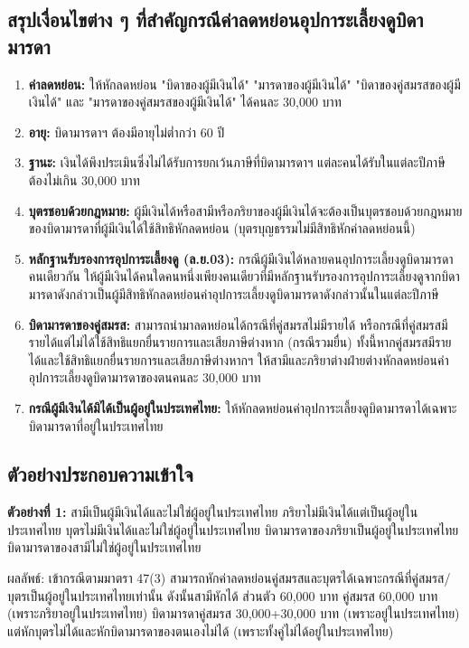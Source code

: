 \documentclass[12pt,a4paper]{article}
\begin{document}
\subsection*{สรุปเงื่อนไขต่าง ๆ ที่สำคัญกรณีค่าลดหย่อนอุปการะเลี้ยงดูบิดามารดา}

\begin{enumerate}
    \item \textbf{ค่าลดหย่อน:} ให้หักลดหย่อน "บิดาของผู้มีเงินได้" "มารดาของผู้มีเงินได้" "บิดาของคู่สมรสของผู้มีเงินได้" และ "มารดาของคู่สมรสของผู้มีเงินได้" ได้คนละ 30,000 บาท
    \item \textbf{อายุ:} บิดามารดาฯ ต้องมีอายุไม่ต่ำกว่า 60 ปี
    \item \textbf{ฐานะ:} เงินได้พึงประเมินซึ่งไม่ได้รับการยกเว้นภาษีที่บิดามารดาฯ แต่ละคนได้รับในแต่ละปีภาษี ต้องไม่เกิน 30,000 บาท
    \item \textbf{บุตรชอบด้วยกฎหมาย:} ผู้มีเงินได้หรือสามีหรือภริยาของผู้มีเงินได้จะต้องเป็นบุตรชอบด้วยกฎหมายของบิดามารดาที่ผู้มีเงินได้ใช้สิทธิหักลดหย่อน (บุตรบุญธรรมไม่มีสิทธิหักค่าลดหย่อนนี้)
    \item \textbf{หลักฐานรับรองการอุปการะเลี้ยงดู (ล.ย.03):} กรณีผู้มีเงินได้หลายคนอุปการะเลี้ยงดูบิดามารดาคนเดียวกัน ให้ผู้มีเงินได้คนใดคนหนึ่งเพียงคนเดียวที่มีหลักฐานรับรองการอุปการะเลี้ยงดูจากบิดามารดาดังกล่าวเป็นผู้มีสิทธิหักลดหย่อนค่าอุปการะเลี้ยงดูบิดามารดาดังกล่าวนั้นในแต่ละปีภาษี
    \item \textbf{บิดามารดาของคู่สมรส:} สามารถนำมาลดหย่อนได้กรณีที่คู่สมรสไม่มีรายได้ หรือกรณีที่คู่สมรสมีรายได้แต่ไม่ได้ใช้สิทธิแยกยื่นรายการและเสียภาษีต่างหาก (กรณีรวมยื่น) ทั้งนี้หากคู่สมรสมีรายได้และใช้สิทธิแยกยื่นรายการและเสียภาษีต่างหากฯ ให้สามีและภริยาต่างฝ่ายต่างหักลดหย่อนค่าอุปการะเลี้ยงดูบิดามารดาของตนคนละ 30,000 บาท
    \item \textbf{กรณีผู้มีเงินได้มิได้เป็นผู้อยู่ในประเทศไทย:} ให้หักลดหย่อนค่าอุปการะเลี้ยงดูบิดามารดาได้เฉพาะบิดามารดาที่อยู่ในประเทศไทย
\end{enumerate}

\subsection*{ตัวอย่างประกอบความเข้าใจ}

\textbf{ตัวอย่างที่ 1:} สามีเป็นผู้มีเงินได้และไม่ใช่ผู้อยู่ในประเทศไทย ภริยาไม่มีเงินได้แต่เป็นผู้อยู่ในประเทศไทย บุตรไม่มีเงินได้และไม่ใช่ผู้อยู่ในประเทศไทย บิดามารดาของภริยาเป็นผู้อยู่ในประเทศไทย บิดามารดาของสามีไม่ใช่ผู้อยู่ในประเทศไทย

ผลลัพธ์: เข้ากรณีตามมาตรา 47(3) สามารถหักค่าลดหย่อนคู่สมรสและบุตรได้เฉพาะกรณีที่คู่สมรส/บุตรเป็นผู้อยู่ในประเทศไทยเท่านั้น ดังนั้นสามีหักได้ ส่วนตัว 60,000 บาท คู่สมรส 60,000 บาท (เพราะภริยาอยู่ในประเทศไทย) บิดามารดาคู่สมรส 30,000+30,000 บาท (เพราะอยู่ในประเทศไทย) แต่หักบุตรไม่ได้และหักบิดามารดาของตนเองไม่ได้ (เพราะทั้งคู่ไม่ได้อยู่ในประเทศไทย)
\end{document}
